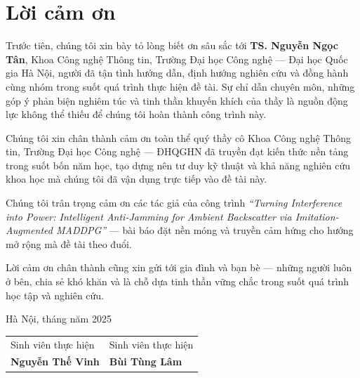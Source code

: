 \chapter*{Lời cảm ơn}

Trước tiên, chúng tôi xin bày tỏ lòng biết ơn sâu sắc tới \textbf{TS. Nguyễn Ngọc Tân},
Khoa Công nghệ Thông tin, Trường Đại học Công nghệ --- Đại học Quốc gia Hà Nội, người đã
tận tình hướng dẫn, định hướng nghiên cứu và đồng hành cùng nhóm trong suốt quá trình thực
hiện đề tài. Sự chỉ dẫn chuyên môn, những góp ý phản biện nghiêm túc và tinh thần khuyến
khích của thầy là nguồn động lực không thể thiếu để chúng tôi hoàn thành công trình này.

Chúng tôi xin chân thành cảm ơn toàn thể quý thầy cô Khoa Công nghệ Thông tin, Trường Đại
học Công nghệ --- ĐHQGHN đã truyền đạt kiến thức nền tảng trong suốt bốn năm học, tạo dựng
nên tư duy kỹ thuật và khả năng nghiên cứu khoa học mà chúng tôi đã vận dụng trực tiếp vào
đề tài này.

Chúng tôi trân trọng cảm ơn các tác giả của công trình \emph{``Turning Interference into
Power: Intelligent Anti-Jamming for Ambient Backscatter via Imitation-Augmented MADDPG''} ---
bài báo đặt nền móng và truyền cảm hứng cho hướng mở rộng mà đề tài theo đuổi.

Lời cảm ơn chân thành cũng xin gửi tới gia đình và bạn bè --- những người luôn ở bên, chia
sẻ khó khăn và là chỗ dựa tinh thần vững chắc trong suốt quá trình học tập và nghiên cứu.

\bigskip

\noindent
Hà Nội, tháng \quad năm 2025

\bigskip

\noindent
\begin{tabular}{@{}p{}p{}@{}}
\centering Sinh viên thực hiện & \centering Sinh viên thực hiện \\[1.5cm]
\centering \textbf{Nguyễn Thế Vinh} & \centering \textbf{Bùi Tùng Lâm}
\end{tabular}
